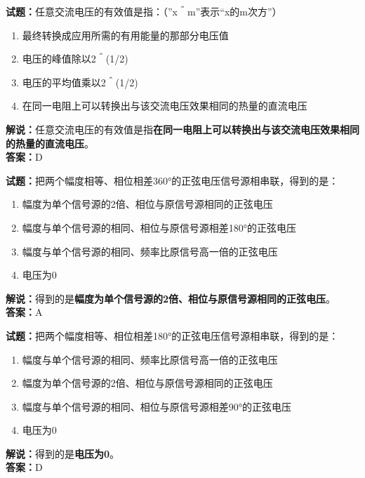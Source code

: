 \documentclass{ctexbook}
\begin{document}
\bigskip


\noindent\textbf{试题：}任意交流电压的有效值是指：（”x＾m”表示“x的m次方”）
\begin{enumerate}[leftmargin=3em]
\item 最终转换成应用所需的有用能量的那部分电压值
\item 电压的峰值除以2＾(1/2)
\item 电压的平均值乘以2＾(1/2)
\item 在同一电阻上可以转换出与该交流电压效果相同的热量的直流电压
\end{enumerate}
\noindent\textbf{解说：}任意交流电压的有效值是指\textbf{在同一电阻上可以转换出与该交流电压效果相同的热量的直流电压}。\\\noindent\textbf{答案：}D



\bigskip


\noindent\textbf{试题：}把两个幅度相等、相位相差360°的正弦电压信号源相串联，得到的是：
\begin{enumerate}[leftmargin=3em]
\item 幅度为单个信号源的2倍、相位与原信号源相同的正弦电压
\item 幅度与单个信号源的相同、相位与原信号源相差180°的正弦电压
\item 幅度与单个信号源的相同、频率比原信号高一倍的正弦电压
\item 电压为0
\end{enumerate}
\noindent\textbf{解说：}得到的是\textbf{幅度为单个信号源的2倍、相位与原信号源相同的正弦电压}。\\\noindent\textbf{答案：}A



\bigskip


\noindent\textbf{试题：}把两个幅度相等、相位相差180°的正弦电压信号源相串联，得到的是：
\begin{enumerate}[leftmargin=3em]
\item 幅度与单个信号源的相同、频率比原信号高一倍的正弦电压
\item 幅度为单个信号源的2倍、相位与原信号源相同的正弦电压
\item 幅度与单个信号源的相同、相位与原信号源相差90°的正弦电压
\item 电压为0
\end{enumerate}
\noindent\textbf{解说：}得到的是\textbf{电压为0}。\\\noindent\textbf{答案：}D



\bigskip
\end{document}
